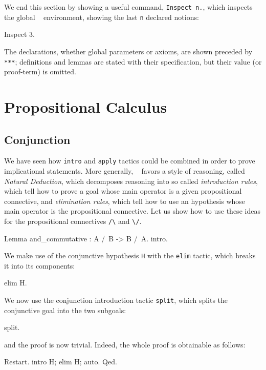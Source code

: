 \documentclass[11pt,a4paper]{book}
\begin{document}
We end this section by showing a useful command, \verb:Inspect n.:,
which inspects the global \Coq~ environment, showing the last \verb:n: declared
notions: 
\begin{coq_example}
Inspect 3.
\end{coq_example}

The declarations, whether global parameters or axioms, are shown preceded by 
\verb:***:; definitions and lemmas are stated with their specification, but
their value (or proof-term) is omitted.

\section{Propositional Calculus}

\subsection{Conjunction}

We have seen how \verb:intro: and \verb:apply: tactics could be combined
in order to prove implicational statements. More generally, \Coq~ favors a style
of reasoning, called {\sl Natural Deduction}, which decomposes reasoning into 
so called {\sl introduction rules}, which tell how to prove a goal whose main 
operator is a given propositional connective, and {\sl elimination rules},
which tell how to use an hypothesis whose main operator is the propositional 
connective. Let us show how to use these ideas for the propositional connectives
\verb:/\: and \verb:\/:.

\begin{coq_example}
Lemma and_commutative : A /\ B -> B /\ A.
intro.
\end{coq_example}

We make use of the conjunctive hypothesis \verb:H: with the \verb:elim: tactic,
which breaks it into its components:
\begin{coq_example}
elim H.
\end{coq_example}

We now use the conjunction introduction tactic \verb:split:, which splits the 
conjunctive goal into the two subgoals:
\begin{coq_example}
split.
\end{coq_example}
and the proof is now trivial. Indeed, the whole proof is obtainable as follows:
\begin{coq_example}
Restart.
intro H; elim H; auto.
Qed.
\end{coq_example}
\end{document}
